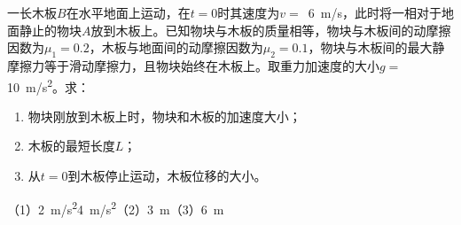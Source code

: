 一长木板\(B\)在水平地面上运动，在\(t = 0\)时其速度为\(v =\) \,\qty{6}{m/s}，此时将一相对于地面静止的物块\(A\)放到木板上。已知物块与木板的质量相等，物块与木板间的动摩擦因数为\(\mu_1 = 0.2\)，木板与地面间的动摩擦因数为\(\mu_2 = 0.1\)，物块与木板间的最大静摩擦力等于滑动摩擦力，且物块始终在木板上。取重力加速度的大小\(g =\) \,\qty{10}{m/s^2}。求：
\begin{enumerate}
	\item 物块刚放到木板上时，物块和木板的加速度大小；
	\item 木板的最短长度\(L\)；
	\item 从\(t = 0\)到木板停止运动，木板位移的大小。
\end{enumerate}
	
\begin{answer}
	（1）\qty{2}{m/s^2}\quad\qty{4}{m/s^2}（2）\qty{3}{m}（3）\qty{6}{m}
\end{answer}